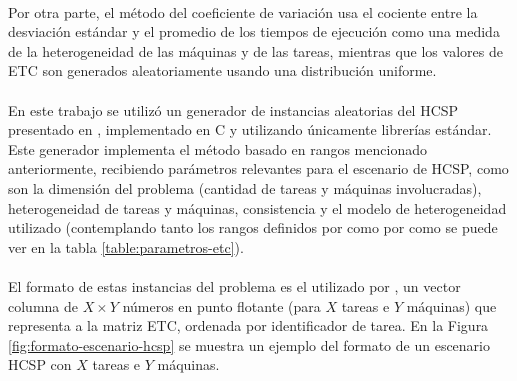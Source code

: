 \begin{table}[h!]
    \centering
    \caption{Parámetros de los modelos ETC}
    \label{table:parametros-etc}
\end{table}

\paragraph{}Por otra parte, el método del coeficiente de variación usa el cociente entre la desviación estándar y el promedio de los tiempos de ejecución como una medida de la heterogeneidad de las máquinas y de las tareas, mientras que los valores de ETC son generados aleatoriamente usando una distribución uniforme.

\paragraph{}En este trabajo se utilizó un generador de instancias aleatorias del HCSP presentado en \citet{bib-doctorado-nesmachnow}, implementado en C y utilizando únicamente librerías estándar.
Este generador implementa el método basado en rangos mencionado anteriormente, recibiendo parámetros relevantes para el escenario de HCSP, como son la dimensión del problema (cantidad de tareas y máquinas involucradas), heterogeneidad de tareas y máquinas, consistencia y el modelo de heterogeneidad utilizado (contemplando tanto los rangos definidos por \citet{bib-ali-hc-etc} como por \citet{bib-braun} como se puede ver en la tabla \ref{table:parametros-etc}).

\paragraph{}El formato de estas instancias del problema es el utilizado por \citet{bib-braun}, un vector columna de $X \times Y$ números en punto flotante (para $X$ tareas e $Y$ máquinas) que representa a la matriz ETC, ordenada por identificador de tarea.
En la Figura \ref{fig:formato-escenario-hcsp} se muestra un ejemplo del formato de un escenario HCSP con $X$ tareas e $Y$ máquinas.
\\

